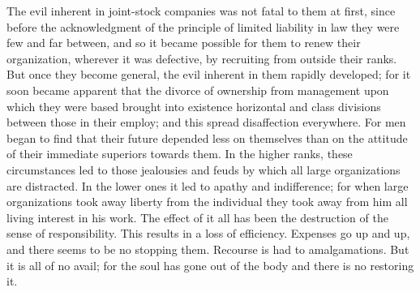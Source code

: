 \documentclass{book}
\begin{document}
The evil inherent in joint-stock companies was not fatal to them at first, since before the acknowledgment of the principle of limited liability in law they were few and far between, and so it became possible for them to renew their organization, wherever it was defective, by recruiting from outside their ranks. But once they become general, the evil inherent in them rapidly developed; for it soon became apparent that the divorce of ownership from management upon which they were based brought into existence horizontal and class divisions between those in their employ; and this spread disaffection everywhere. For men began to find that their future depended less on themselves than on the attitude of their immediate superiors towards them. In the higher ranks, these circumstances led to those jealousies and feuds by which all large organizations are distracted. In the lower ones it led to apathy and indifference; for when large organizations took away liberty from the individual they took away from him all living interest in his work. The effect of it all has been the destruction of the sense of responsibility. This results in a loss of efficiency. Expenses go up and up, and there seems to be no stopping them. Recourse is had to amalgamations. But it is all of no avail; for the soul has gone out of the body and there is no restoring it.
\end{document}
